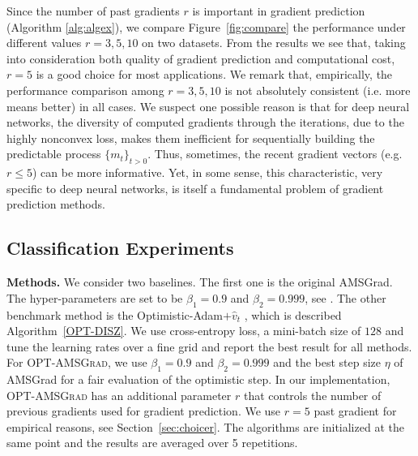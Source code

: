 \documentclass[wcp]{jmlr}
\begin{document}
Since the number of past gradients $r$ is important in gradient prediction (Algorithm \ref{alg:algex}), we compare Figure~\ref{fig:compare} the performance under different values $r=3,5,10$ on two datasets. 
From the results we see that, taking into consideration both quality of gradient prediction and computational cost, $r=5$ is a good choice for most applications. 
We remark that, empirically, the performance comparison among $r=3,5,10$ is not absolutely consistent (i.e. more means better) in all cases. We suspect one possible reason is that for deep neural networks, the diversity of computed gradients through the iterations, due to the highly nonconvex loss, makes them inefficient for sequentially building the predictable process $\{m_t\}_{t>0}$. 
Thus, sometimes, the recent gradient vectors (e.g. $r\leq 5$) can be more informative. 
Yet, in some sense, this characteristic, very specific to deep neural networks, is itself a fundamental problem of gradient prediction methods. 


\subsection{Classification Experiments}


\textbf{Methods.}
We consider two baselines. The first one is the original AMSGrad. 
The hyper-parameters are set to be $\beta_1 = 0.9$ and $\beta_2 = 0.999$, see \citet{RKK18}. 
The other benchmark method is the Optimistic-Adam$+\hat{v}_t$ \citep{DISZ18}, which is described Algorithm~\ref{OPT-DISZ}. 
We use cross-entropy loss, a mini-batch size of $128$ and tune the learning rates over a fine grid and report the best result for all methods.
For \textsc{OPT-AMSGrad}, we use $\beta_1 = 0.9$ and $\beta_2 = 0.999$ and the best step size $\eta$ of AMSGrad for a fair evaluation of the optimistic step. In our implementation, \textsc{OPT-AMSGrad} has an additional parameter $r$ that controls the number of previous gradients used for gradient prediction. 
We use $r=5$ past gradient for empirical reasons, see Section~\ref{sec:choicer}.
The algorithms are initialized at the same point and the results are averaged over 5 repetitions.
\end{document}
